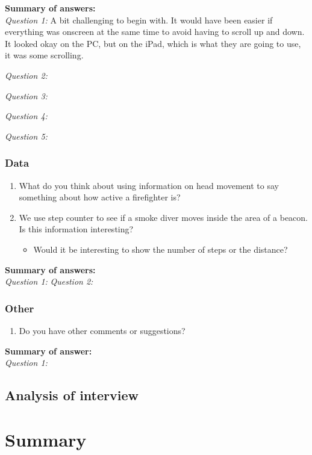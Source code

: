 \documentclass[../Main/thesis.tex]{subfiles}
\begin{document}
\textbf{Summary of answers:}\\
\textit{Question 1:}
A bit challenging to begin with.
It would have been easier if everything was onscreen at the same time to avoid having to scroll up and down.
It looked okay on the PC, but on the iPad, which is what they are going to use, it was some scrolling.

\textit{Question 2:}


\textit{Question 3:}

\textit{Question 4:}

\textit{Question 5:}

\subsubsection*{Data}
\begin{enumerate}
	\item What do you think about using information on head movement to say something about how active a firefighter is?
	\item We use step counter to see if a smoke diver moves inside the area of a beacon. Is this information interesting?
	\begin{itemize}
		\item Would it be interesting to show the number of steps or the distance?
	\end{itemize}
\end{enumerate}

\textbf{Summary of answers:}\\
\textit{Question 1:}
\textit{Question 2:}

\subsubsection*{Other}
\begin{enumerate}
	\item Do you have other comments or suggestions?
\end{enumerate}

\textbf{Summary of answer:}\\
\textit{Question 1:}

\subsection{Analysis of interview}

\section{Summary}
\end{document}
